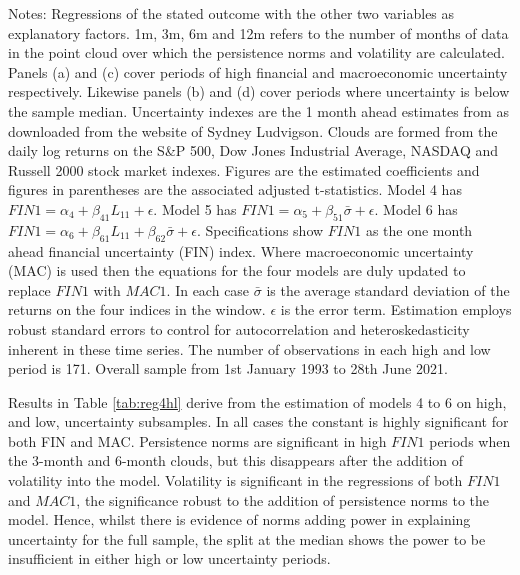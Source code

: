 \documentclass{article}
\begin{document}
\begin{sidewaystable}
\begin{center}
\begin{small}
\begin{tabular}{ll l c c c c c c c c c c c c c}
             \hline
        \end{tabular}
        \end{small}
    \end{center}
\footnotesize{Notes: Regressions of the stated outcome with the other two variables as explanatory factors. 1m, 3m, 6m and 12m refers to the number of months of data in the point cloud over which the persistence norms and volatility are calculated. Panels (a) and (c) cover periods of high financial and macroeconomic uncertainty respectively. Likewise panels (b) and (d) cover periods where uncertainty is below the sample median. Uncertainty indexes are the 1 month ahead estimates from \cite{jurado2015measuring} as downloaded from the website of Sydney Ludvigson. Clouds are formed from the daily log returns on the S\&P 500, Dow Jones Industrial Average, NASDAQ and Russell 2000 stock market indexes. Figures are the estimated coefficients and figures in parentheses are the associated \cite{newey1987simple} adjusted t-statistics. Model 4 has $FIN1 = \alpha_4 + \beta_{41}L_{11} + \epsilon$. Model 5 has $FIN1 = \alpha_5 + \beta_{51}\bar{\sigma} + \epsilon$. Model 6 has $FIN1 = \alpha_6 + \beta_{61}L_{11} + \beta_{62}\bar{\sigma}+\epsilon$. Specifications show $FIN1$ as the one month ahead financial uncertainty (FIN) index. Where macroeconomic uncertainty (MAC) is used then the equations for the four models are duly updated to replace $FIN1$ with $MAC1$. In each case $\bar{\sigma}$ is the average standard deviation of the returns on the four indices in the window. $\epsilon$ is the error term. Estimation employs \cite{newey1987simple} robust standard errors to control for autocorrelation and heteroskedasticity inherent in these time series. The number of observations in each high and low period is 171. Overall sample from 1st January 1993 to 28th June 2021.}
\end{sidewaystable}
   
Results in Table \ref{tab:reg4hl} derive from the estimation of models 4 to 6 on high, and low, uncertainty subsamples. In all cases the constant is highly significant for both FIN and MAC. Persistence norms are significant in high $FIN1$ periods when the 3-month and 6-month clouds, but this disappears after the addition of volatility into the model. Volatility is significant in the regressions of both $FIN1$ and $MAC1$, the significance robust to the addition of persistence norms to the model. Hence, whilst there is evidence of norms adding power in explaining uncertainty for the full sample, the split at the median shows the power to be insufficient in either high or low uncertainty periods.
\end{document}
